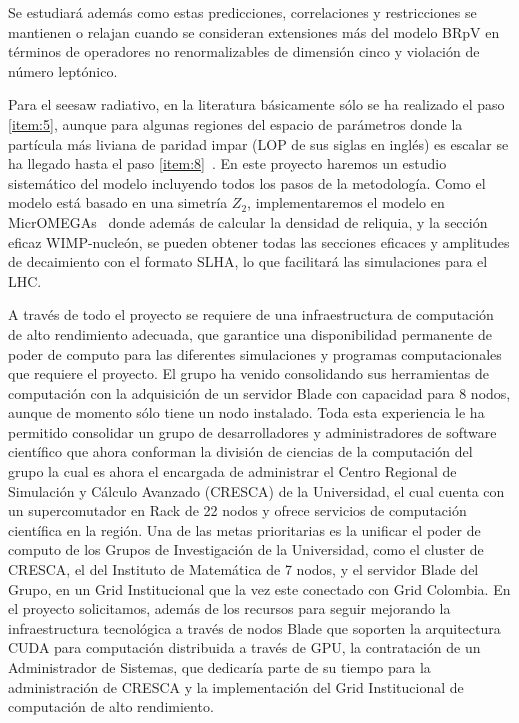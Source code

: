 \begin{bbrpvlhc}
   Se estudiará además como estas predicciones, correlaciones y
   restricciones se mantienen o relajan cuando se consideran
   extensiones más del modelo BRpV en términos de operadores no
   renormalizables de dimensión cinco y violación de número leptónico.  
\end{bbrpvlhc}

\begin{darkmatter}
  Para el seesaw radiativo, en la literatura básicamente sólo se ha
  realizado el paso \ref{item:5}, aunque para algunas regiones del
  espacio de parámetros donde la partícula más liviana de paridad
  impar (LOP de sus siglas en inglés) es escalar se ha llegado hasta
  el paso \ref{item:8}~\cite{Bergman:2007pm}. En este proyecto haremos un
  estudio sistemático del modelo incluyendo todos los pasos de la
  metodología. Como el modelo está basado en una simetría $Z_2$,
  implementaremos el modelo en MicrOMEGAs~\cite{Belanger:2006is,Belanger:2008sj,Belanger:2010gh} donde
  además de calcular la densidad de reliquia, y la sección eficaz
  WIMP-nucleón, se pueden obtener todas las secciones eficaces y
  amplitudes de decaimiento con el formato SLHA, lo que facilitará las
  simulaciones para el LHC.
\end{darkmatter}




A través de todo el proyecto se requiere de una infraestructura de
computación de alto rendimiento adecuada, que garantice una
disponibilidad permanente de poder de computo para las diferentes
simulaciones y programas computacionales que requiere el proyecto. El
grupo ha venido consolidando sus herramientas de computación con la
adquisición de un servidor Blade con capacidad para 8 nodos, aunque de
momento sólo tiene un nodo instalado. Toda esta experiencia le ha
permitido consolidar un grupo de desarrolladores y administradores de
software científico que ahora conforman la división de ciencias de la
computación del grupo la cual es ahora el encargada de administrar el
Centro Regional de Simulación y Cálculo Avanzado (CRESCA) de la
Universidad, el cual cuenta con un supercomutador en Rack de 22 nodos
y ofrece servicios de computación científica en la región.  Una de las
metas prioritarias es la unificar el poder de computo de los Grupos de
Investigación de la Universidad, como el cluster de CRESCA, el del
Instituto de Matemática de 7 nodos, y el servidor Blade del Grupo, en
un Grid Institucional que la vez este conectado con Grid Colombia. En
el proyecto solicitamos, además de los recursos para seguir mejorando
la infraestructura tecnológica a través de nodos Blade que soporten la
arquitectura CUDA para computación distribuida a través de GPU, la
contratación de un Administrador de Sistemas, que dedicaría parte de
su tiempo para la administración de CRESCA y la implementación del
Grid Institucional de computación de alto rendimiento.



